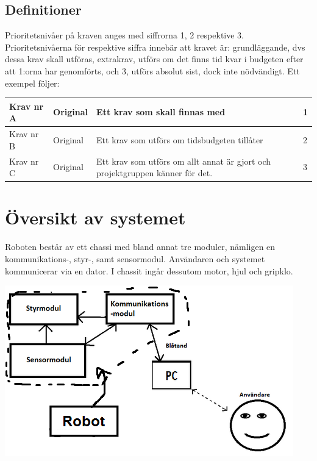 \documentclass[11pt]{article}
\begin{document}
\begin{flushleft}
\subsection{Definitioner}
Prioritetsnivåer på kraven anges med siffrorna 1, 2 respektive 3. Prioritetsnivåerna för respektive siffra innebär att kravet är: grundläggande, dvs dessa krav skall utföras, extrakrav, utförs om det finns tid kvar i budgeten efter att 1:orna har genomförts, och 3, utförs absolut sist, dock inte nödvändigt. Ett exempel följer:


\begin{center}
\begin{longtable}{|l|l|p{.70\linewidth}|l|} \hline
Krav nr A&
Original&
Ett krav som skall finnas med&
1 \\ \hline

Krav nr B&
Original &
Ett krav som utförs om tidsbudgeten tillåter &
2 \\ \hline

Krav nr C&
Original &
Ett krav som utförs om allt annat är gjort och projektgruppen känner för det.&
3 \\ \hline
\end{longtable}
\end{center}


\pagebreak

\section{Översikt av systemet}
Roboten består av ett chassi med bland annat tre moduler, nämligen en kommunikations-, styr-, samt sensormodul. Användaren och systemet kommunicerar via en dator. I chassit ingår dessutom motor, hjul och gripklo.

\begin{center}
\includegraphics{systemskiss}


\end{center}
\end{flushleft}
\end{document}
